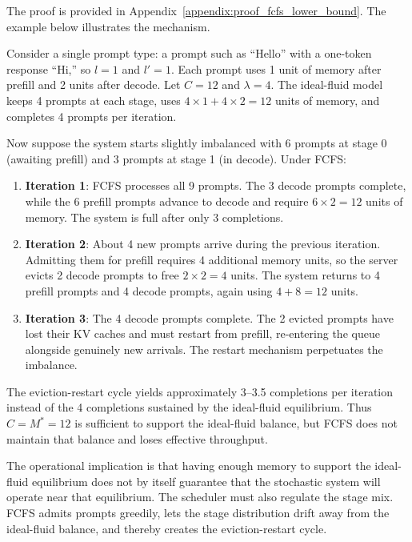 The proof is provided in Appendix~\ref{appendix:proof_fcfs_lower_bound}. The example below illustrates the mechanism.

\begin{example}
\label{ex:fcfs_cascade}
Consider a single prompt type: a prompt such as ``Hello'' with a one-token response ``Hi,'' so \(l=1\) and \(l'=1\). Each prompt uses 1 unit of memory after prefill and 2 units after decode. Let \(C=12\) and \(\lambda=4\). The ideal-fluid model keeps 4 prompts at each stage, uses \(4 \times 1 + 4 \times 2 = 12\) units of memory, and completes 4 prompts per iteration.

Now suppose the system starts slightly imbalanced with 6 prompts at stage 0 (awaiting prefill) and 3 prompts at stage 1 (in decode). Under FCFS:
\begin{enumerate}
    \item \textbf{Iteration 1}: FCFS processes all 9 prompts. The 3 decode prompts complete, while the 6 prefill prompts advance to decode and require \(6 \times 2 = 12\) units of memory. The system is full after only 3 completions.
    \item \textbf{Iteration 2}: About 4 new prompts arrive during the previous iteration. Admitting them for prefill requires 4 additional memory units, so the server evicts 2 decode prompts to free \(2 \times 2 = 4\) units. The system returns to 4 prefill prompts and 4 decode prompts, again using \(4+8=12\) units.
    \item \textbf{Iteration 3}: The 4 decode prompts complete. The 2 evicted prompts have lost their KV caches and must restart from prefill, re-entering the queue alongside genuinely new arrivals. The restart mechanism perpetuates the imbalance.
\end{enumerate}
The eviction-restart cycle yields approximately 3--3.5 completions per iteration instead of the 4 completions sustained by the ideal-fluid equilibrium. Thus \(C=M^*=12\) is sufficient to support the ideal-fluid balance, but FCFS does not maintain that balance and loses effective throughput.
\end{example}

The operational implication is that having enough memory to support the ideal-fluid equilibrium does not by itself guarantee that the stochastic system will operate near that equilibrium. The scheduler must also regulate the stage mix. FCFS admits prompts greedily, lets the stage distribution drift away from the ideal-fluid balance, and thereby creates the eviction-restart cycle.

